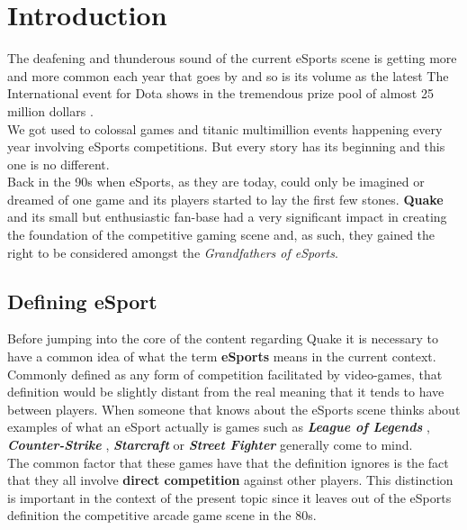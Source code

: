 \section{Introduction}
\label{sec::introduction}

The deafening and thunderous sound of the current eSports scene is getting more and more common each year that goes by and so is its volume as the latest The International event for Dota shows in the tremendous prize pool of almost 25 million dollars \citep{esportsEarnings}.\\

We got used to colossal games and titanic multimillion events happening every year involving eSports competitions. But every story has its beginning and this one is no different.\\

Back in the 90s when eSports, as they are today, could only be imagined or dreamed of one game and its players started to lay the first few stones. \textbf{Quake} and its small but enthusiastic fan-base had a very significant impact in creating the foundation of the competitive gaming scene and, as such, they gained the right to be considered amongst the \textit{Grandfathers of eSports}.\\

\subsection{Defining eSport}

Before jumping into the core of the content regarding Quake it is necessary to have a common idea of what the term \textbf{eSports} means in the current context. Commonly defined as any form of competition facilitated by video-games, that definition would be slightly distant from the real meaning that it tends to have between players. When someone that knows about the eSports scene thinks about examples of what an eSport actually is games such as \textbf{\textit{League of Legends}} \citep{game:league}, \textit{\textbf{Counter-Strike}} \citep{game:cs}, \textbf{\textit{Starcraft}} \citep{game:starcraft} or \textit{\textbf{Street Fighter}} \citep{game:streetfighter} generally come to mind.\\

The common factor that these games have that the definition ignores is the fact that they all involve \textbf{direct competition} against other players. This distinction is important in the context of the present topic since it leaves out of the eSports definition the competitive arcade game scene in the 80s.\\

